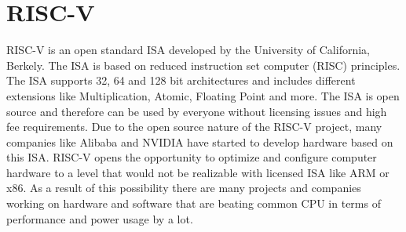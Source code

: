 \section{RISC-V}
RISC-V is an open standard \acf{ISA} developed by the
University of California, Berkely. The ISA is based on reduced instruction set
computer (RISC) principles. The ISA supports 32, 64 and 128 bit architectures and
includes different extensions like Multiplication, Atomic, Floating Point and more. The
ISA is open source and therefore can be used by everyone without licensing issues
and high fee requirements. Due to the open source nature of the RISC-V project,
many companies like Alibaba and NVIDIA have started to develop hardware based
on this ISA.
RISC-V opens the opportunity to optimize and configure computer hardware to a
level that would not be realizable with licensed ISA like ARM or x86. As a result of
this possibility there are many projects and companies working on hardware and
software that are beating common CPU in terms of performance and power usage
by a lot.

